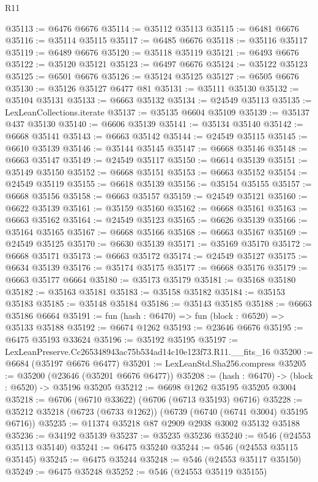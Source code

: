 \begin{lexlean}{R11}
\begin{coremodule}
@35113 := @6476 @6676
@35114 := @35112 @35113
@35115 := @6481 @6676
@35116 := @35114 @35115
@35117 := @6485 @6676
@35118 := @35116 @35117
@35119 := @6489 @6676
@35120 := @35118 @35119
@35121 := @6493 @6676
@35122 := @35120 @35121
@35123 := @6497 @6676
@35124 := @35122 @35123
@35125 := @6501 @6676
@35126 := @35124 @35125
@35127 := @6505 @6676
@35130 := @35126 @35127 @6477 @81
@35131 := @35111 @35130
@35132 := @35104 @35131
@35133 := @6663 @35132
@35134 := @24549 @35113
@35135 := LexLeanCollections.iterate
@35137 := @35135 @6604 @35109
@35139 := @35137 @437 @35130
@35140 := @6606 @35139
@35141 := @35134 @35140
@35142 := @6668 @35141
@35143 := @6663 @35142
@35144 := @24549 @35115
@35145 := @6610 @35139
@35146 := @35144 @35145
@35147 := @6668 @35146
@35148 := @6663 @35147
@35149 := @24549 @35117
@35150 := @6614 @35139
@35151 := @35149 @35150
@35152 := @6668 @35151
@35153 := @6663 @35152
@35154 := @24549 @35119
@35155 := @6618 @35139
@35156 := @35154 @35155
@35157 := @6668 @35156
@35158 := @6663 @35157
@35159 := @24549 @35121
@35160 := @6622 @35139
@35161 := @35159 @35160
@35162 := @6668 @35161
@35163 := @6663 @35162
@35164 := @24549 @35123
@35165 := @6626 @35139
@35166 := @35164 @35165
@35167 := @6668 @35166
@35168 := @6663 @35167
@35169 := @24549 @35125
@35170 := @6630 @35139
@35171 := @35169 @35170
@35172 := @6668 @35171
@35173 := @6663 @35172
@35174 := @24549 @35127
@35175 := @6634 @35139
@35176 := @35174 @35175
@35177 := @6668 @35176
@35179 := @6663 @35177 @6664
@35180 := @35173 @35179
@35181 := @35168 @35180
@35182 := @35163 @35181
@35183 := @35158 @35182
@35184 := @35153 @35183
@35185 := @35148 @35184
@35186 := @35143 @35185
@35188 := @6663 @35186 @6664
@35191 := fun (hash : @6470) => fun (block : @6520) => @35133 @35188
@35192 := @6674 @1262
@35193 := @23646 @6676
@35195 := @6475 @35193 @33624
@35196 := @35192 @35195
@35197 := LexLeanPreserve.Cc265348943ac75b534ad14c10e123f73.R11.__fits_16
@35200 := @6684 (@35197 @6676 @6477)
@35201 := LexLeanStd.Sha256.compress
@35205 := @35200 (@23646 (@35201 @6676 @6477))
@35208 := (hash : @6470) -> (block : @6520) -> @35196 @35205
@35212 := @6698 @1262 @35195 @35205 @3004
@35218 := @6706 (@6710 @33622) (@6706 (@6713 @35193) @6716)
@35228 := @35212 @35218 (@6723 (@6733 @1262)) (@6739 (@6740 (@6741 @3004) @35195 @6716))
@35235 := @11374 @35218 @87 @2909 @2938 @3002 @35132 @35188
@35236 := @34192 @35139
@35237 := @35235 @35236
@35240 := @546 (@24553 @35113 @35140)
@35241 := @6475 @35240
@35244 := @546 (@24553 @35115 @35145)
@35245 := @6475 @35244
@35248 := @546 (@24553 @35117 @35150)
@35249 := @6475 @35248
@35252 := @546 (@24553 @35119 @35155)

\end{coremodule}
\end{lexlean}
